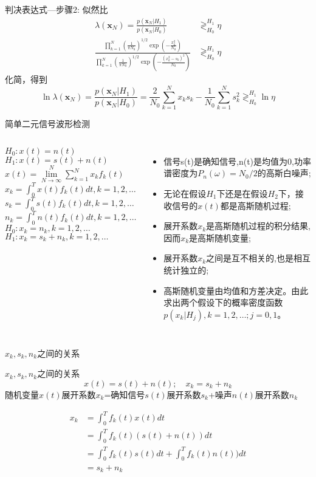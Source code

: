\begin{frame}[shrink]{判决表达式---步骤2: 似然比}
\begin{align*}
\lambda(\bm{x}_N)=\frac{p(\bm{x}_N|H_1)}{p(\bm{x}_N|H_0)}&\mathop{\gtrless}_{H_0}^{H_1}\eta\\
\frac{\prod\limits_{k=1}^{N}\left(\frac{1}{\pi N_0}\right)^{1/2}\exp\left(-\frac{x_k^2}{N_0}\right)}
{\prod\limits_{k=1}^{N}\left(\frac{1}{\pi N_0}\right)^{1/2}\exp\left(-\frac{(x_k^2-s_k)^2}{N_0}\right)}&\mathop{\gtrless}_{H_0}^{H_1}\eta
\end{align*}
化简，得到
\[\ln\lambda(\bm{x}_N)=\frac{p(\bm{x}_N|H_1)}{p(\bm{x}_N|H_0)}=\frac{2}{N_0}\sum\limits_{k=1}^{N}x_ks_k-\frac{1}{N_0}\sum\limits_{k=1}^{N}s_k^2\mathop{\gtrless}_{H_0}^{H_1}\ln\eta \]
\end{frame}


\begin{frame}{简单二元信号波形检测}
\begin{columns}
	$H_0: x(t)=n(t)$\\
	$H_1: x(t)=s(t)+n(t)$\\
	$x(t)=\lim\limits_{N\to\infty}^N\sum\limits_{k=1}^Nx_kf_k(t)$\\
	$x_k=\int_{0}^{T}x(t)f_k(t)dt, k=1,2,\dots$\\
	$s_k=\int_{0}^{T}s(t)f_k(t)dt, k=1,2,\dots$\\
	$n_k=\int_{0}^{T}n(t)f_k(t)dt, k=1,2,\dots$\\
	$H_0: x_k=n_k,k=1,2,\dots$\\
	$H_1: x_k=s_k+n_k,k=1,2,\dots$
	\begin{itemize}
		\item 信号s(t)是确知信号,n(t)是均值为0,功率谱密度为$P_n(\omega)=N_0/2$的高斯白噪声;
		\item 无论在假设$H_1$下还是在假设$H_2$下，接收信号的$x(t)$都是高斯随机过程;
		\item 展开系数$x_k$是高斯随机过程的积分结果,因而$x_k$是高斯随机变量;
		\item 展开系数$x_k$之间是互不相关的,也是相互统计独立的;
		\item 高斯随机变量由均值和方差决定。由此求出两个假设下的概率密度函数$p(x_k|H_j),k=1,2,\dots;j=0,1$。
	\end{itemize}
\end{columns}
\end{frame}

\begin{frame}{$x_k,s_k,n_k$之间的关系}
\begin{block}{$x_k,s_k,n_k$之间的关系}
	\[x(t)=s(t)+n(t); \quad x_k=s_k+n_k \]
	随机变量$x(t)$展开系数$x_k$=确知信号$s(t)$展开系数$s_k$+噪声$n(t)$展开系数$n_k$
\end{block}
\begin{align*}
x_k&=\int_{0}^{T}f_k(t)x(t)dt\\
&=\int_{0}^{T}f_k(t)(s(t)+n(t))dt\\
&=\int_{0}^{T}f_k(t)s(t)dt+\int_{0}^{T}f_k(t)n(t))dt\\
&=s_k+n_k
\end{align*}
\end{frame}

